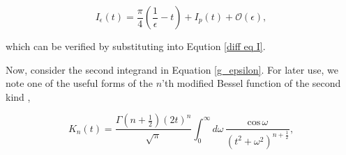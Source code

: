 \documentclass{article}
\numberwithin{equation}{section} %
\begin{document}

\begin{equation}
I_\epsilon(t) = \frac{\pi}{4}(\frac{1}{\epsilon}-t) + I_p(t) +\mathcal{O}(\epsilon),
\label{I full solution}
\end{equation}

\noindent which can be verified by substituting into Eqution \ref{diff eq I}.

Now, consider the second integrand in Equation \ref{g_epsilon}. For later use, we note one of the useful forms of the $n$'th modified Bessel function of the second kind \cite{bessel},

%



\begin{equation}
K_n(t) = \frac{\Gamma(n+\frac{1}{2})(2t)^n}{\sqrt{\pi}}\int^\infty_0 d\omega \, \frac{\mathrm{cos \,} \omega}{(t^2 + \omega^2)^{n+\frac{1}{2}}},
\label{Kn}
\end{equation}
\end{document}
